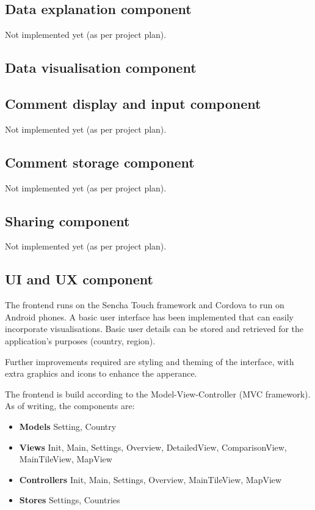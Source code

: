 \documentclass[12pt,a4paper,twoside]{article}
\begin{document}
\subsection{Data explanation component}
Not implemented yet (as per project plan).

\subsection{Data visualisation component}

\subsection{Comment display and input component}
Not implemented yet (as per project plan).

\subsection{Comment storage component}
Not implemented yet (as per project plan).

\subsection{Sharing component}
Not implemented yet (as per project plan).

\subsection{UI and UX component}
The frontend runs on the Sencha Touch framework and Cordova to run on Android phones. A basic user interface has been implemented that can easily incorporate visualisations. Basic user details can be stored and retrieved for the application's purposes (country, region).

Further improvements required are styling and theming of the interface, with extra graphics and icons to enhance the apperance.

The frontend is build according to the Model-View-Controller (MVC framework). As of writing, the components are:

\begin{itemize}
	\item \textbf{Models} Setting, Country
	\item \textbf{Views} Init, Main, Settings, Overview, DetailedView, ComparisonView, MainTileView, MapView
	\item \textbf{Controllers} Init, Main, Settings, Overview, MainTileView, MapView
	\item \textbf{Stores} Settings, Countries
\end{itemize}
\end{document}
